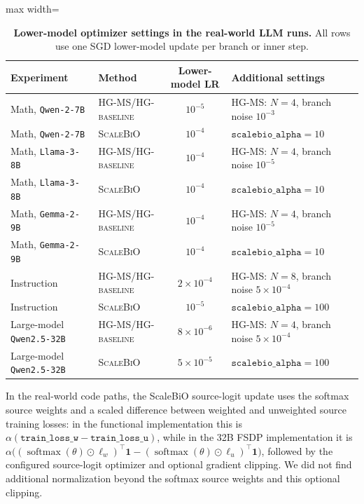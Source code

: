 \documentclass{article}
\theoremstyle{normaltheorem}
\newcommand{\softmax}{\operatorname{softmax}}
\begin{document}
\begin{table}[t]
  \centering
  \caption{\textbf{Lower-model optimizer settings in the real-world LLM runs.}
  All rows use one SGD lower-model update per branch or inner step.}
  \label{tab:llm-lower-model-hparams}
  \begin{adjustbox}{max width=\textwidth}
  \begin{tabular}{llcl}
    \toprule
    Experiment & Method & Lower-model LR & Additional settings \\
    \midrule
    Math, \texttt{Qwen-2-7B} & \textsc{HG-MS}/\textsc{HG-baseline} & \(10^{-5}\) & \textsc{HG-MS}: \(N=4\), branch noise \(10^{-3}\) \\
    Math, \texttt{Qwen-2-7B} & \textsc{ScaleBiO} & \(10^{-4}\) & \(\texttt{scalebio\_alpha}=10\) \\
    Math, \texttt{Llama-3-8B} & \textsc{HG-MS}/\textsc{HG-baseline} & $10^{-4}$ & \textsc{HG-MS}: \(N=4\), branch noise $10^{-5}$ \\
    Math, \texttt{Llama-3-8B} & \textsc{ScaleBiO} & $10^{-4}$ & \(\texttt{scalebio\_alpha}=10\) \\
    Math, \texttt{Gemma-2-9B} & \textsc{HG-MS}/\textsc{HG-baseline} & $10^{-4}$ & \textsc{HG-MS}: \(N=4\), branch noise $10^{-5}$ \\
    Math, \texttt{Gemma-2-9B} & \textsc{ScaleBiO} & $10^{-4}$ & \(\texttt{scalebio\_alpha}=10\) \\
    Instruction & \textsc{HG-MS}/\textsc{HG-baseline} & \(2\times10^{-4}\) & \textsc{HG-MS}: \(N=8\), branch noise \(5\times10^{-4}\) \\
    Instruction & \textsc{ScaleBiO} & \(10^{-5}\) & \(\texttt{scalebio\_alpha}=100\) \\
    Large-model \texttt{Qwen2.5-32B} & \textsc{HG-MS}/\textsc{HG-baseline} & \(8\times10^{-6}\) & HG-MS: \(N=4\), branch noise \(5\times10^{-4}\) \\
    Large-model \texttt{Qwen2.5-32B} & \textsc{ScaleBiO} & \(5\times10^{-5}\) & \(\texttt{scalebio\_alpha}=100\) \\
    \bottomrule
  \end{tabular}
  \end{adjustbox}
\end{table}

In the real-world code paths, the ScaleBiO source-logit update uses the softmax source weights and a scaled difference
between weighted and unweighted source training losses: in the functional implementation this is
\(\alpha(\texttt{train\_loss\_w}-\texttt{train\_loss\_u})\), while in the 32B FSDP implementation it is
\(\alpha\big((\softmax(\theta)\odot\ell_w)^\top\mathbf 1-(\softmax(\theta)\odot\ell_u)^\top\mathbf 1\big)\), followed by
the configured source-logit optimizer and optional gradient clipping. We did not find additional normalization beyond the
softmax source weights and this optional clipping.
\end{document}
